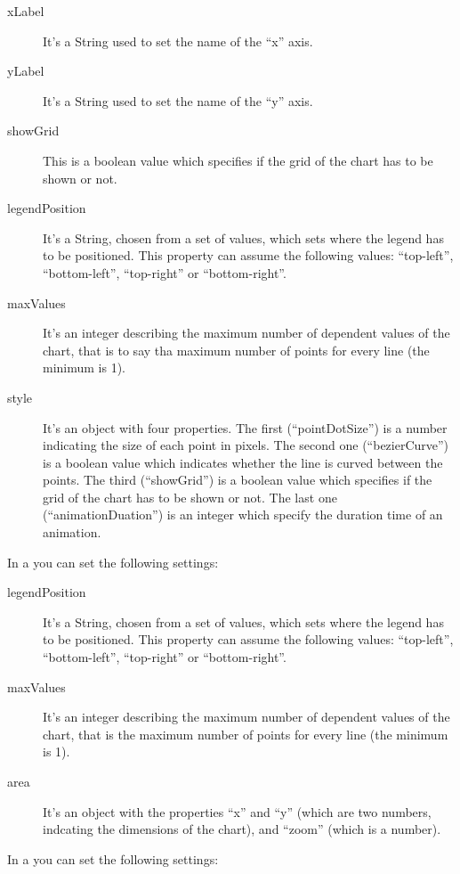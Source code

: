 				\begin{description}
					\item[xLabel] It's a String used to set the name of the “x” axis.
					\item[yLabel] It's a String used to set the name of the “y” axis.
					\item[showGrid] This is a boolean value which specifies if the grid of the chart has to be shown or not.
					\item[legendPosition] It's a String, chosen from a set of values, which sets where the legend has to be positioned. This property can assume the following values: “top-left”, “bottom-left”, “top-right” or “bottom-right”.
					\item[maxValues] It's an integer describing the maximum number of dependent values of the chart, that is to say tha maximum number of points for every line (the minimum is 1).
					\item[style] It's an object with four properties. The first (“pointDotSize”) is a number indicating the size of each point in pixels. The second one (“bezierCurve”) is a boolean value which indicates whether the line is curved between the points. The third (“showGrid”) is a boolean value which specifies if the grid of the chart has to be shown or not. The last one (“animationDuation”) is an integer which specify the duration time of an animation.
				\end{description}
				In a  you can set the following settings:
				\begin{description}
					\item[legendPosition] It's a String, chosen from a set of values, which sets where the legend has to be positioned. This property can assume the following values: “top-left”, “bottom-left”, “top-right” or “bottom-right”.
					\item[maxValues] It's an integer describing the maximum number of dependent values of the chart, that is the maximum number of points for every line (the minimum is 1).
					\item[area] It's an object with the properties “x” and “y” (which are two numbers, indcating the dimensions of the chart), and “zoom” (which is a number).
				\end{description}
				In a  you can set the following settings:
